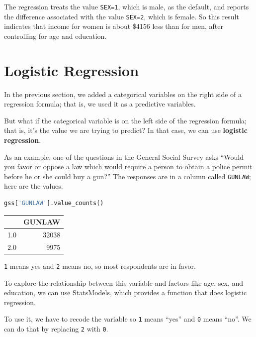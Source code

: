 The regression treats the value \passthrough{\lstinline!SEX=1!}, which
is male, as the default, and reports the difference associated with the
value \passthrough{\lstinline!SEX=2!}, which is female. So this result
indicates that income for women is about \$4156 less than for men, after
controlling for age and education.

\hypertarget{logistic-regression}{%
\section{Logistic Regression}\label{logistic-regression}}

In the previous section, we added a categorical variables on the right
side of a regression formula; that is, we used it as a predictive
variables.

But what if the categorical variable is on the left side of the
regression formula; that is, it's the value we are trying to predict? In
that case, we can use \textbf{logistic regression}.

As an example, one of the questions in the General Social Survey asks
``Would you favor or oppose a law which would require a person to obtain
a police permit before he or she could buy a gun?'' The responses are in
a column called \passthrough{\lstinline!GUNLAW!}; here are the values.

\begin{lstlisting}[language=Python,style=source]
gss['GUNLAW'].value_counts()
\end{lstlisting}

\begin{tabular}{lr}
\toprule
{} &  GUNLAW \\
\midrule
1.0 &   32038 \\
2.0 &    9975 \\
\bottomrule
\end{tabular}

\passthrough{\lstinline!1!} means yes and \passthrough{\lstinline!2!}
means no, so most respondents are in favor.

To explore the relationship between this variable and factors like age,
sex, and education, we can use StatsModels, which provides a function
that does logistic regression.

To use it, we have to recode the variable so \passthrough{\lstinline!1!}
means ``yes'' and \passthrough{\lstinline!0!} means ``no''. We can do
that by replacing \passthrough{\lstinline!2!} with
\passthrough{\lstinline!0!}.

